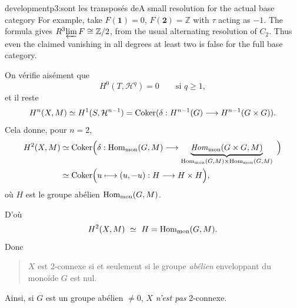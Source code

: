 \begin{dcomment}{development}{p3:sont les transposés de}{A small resolution for the actual base category}
For example, take $F(\mathbf1)=0$, $F(\mathbf2)=\mathbb Z$ with $\tau$ acting as $-1$. The formula gives $R^3\!\varprojlim F\cong\mathbb Z/2$, from the usual alternating resolution of $C_2$. Thus even the claimed vanishing in all degrees at least two is false for the full base category.
\end{dcomment}


On vérifie aisément que
\[
H^0(T,\mathcal{H}^q) = 0 \qquad \text{si } q\geq 1,
\]
et il reste
\[
H^n(X,M) \simeq H^1(S,\mathcal{H}^{n-1}) = \Coker(\delta : H^{n-1}(G) \longrightarrow H^{n-1}(G\times G)). %
\]
Cela donne, pour $n = 2$,
\[
\begin{aligned}
H^2(X,M) &\simeq \mathrm{Coker}\Big(\delta : \mathrm{Hom}_{\mathrm{mon}}(G,M) \longrightarrow \underbrace{\mathit{Hom}_{\mathrm{mon}}(G\times G, M)}_{\mathrm{Hom}_{\mathrm{mon}}(G,M)\times\mathrm{Hom}_{\mathrm{mon}}(G,M)} \ \Big)\\
&\simeq \mathrm{Coker}\Big(u\longmapsto (u,-u) : H \longrightarrow H\times H\Big),
\end{aligned}
\]
où $H$ est le groupe abélien $\mathrm{Hom}_{\mathrm{mon}}(G,M)$.

D'où
\[
H^2(X,M) \ \simeq\ H = \mathrm{Hom}_{\mathrm{mon}}(G,M).
\]
Donc
\begin{quote}
$X$ est 2-connexe si et seulement si le groupe \textit{abélien} enveloppant du monoïde $G$ est nul.
\end{quote}

Ainsi, si $G$ est un groupe abélien $\neq 0$, $X$ \textit{n'est pas} 2-connexe.

